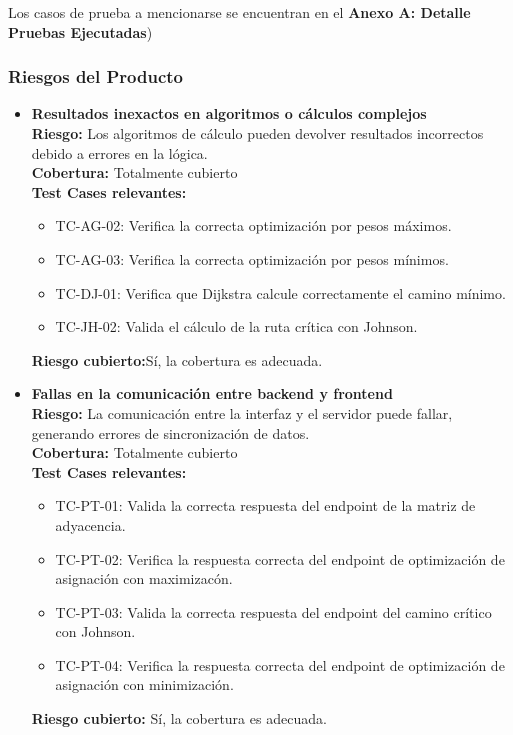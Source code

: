 \documentclass[stu, 12pt, letterpaper, donotrepeattitle, floatsintext, natbib]{apa7}
\begin{document}
\noindent Los casos de prueba a mencionarse se encuentran en el \textbf{Anexo A: Detalle Pruebas Ejecutadas})
\subsubsection{Riesgos del Producto}

\begin{itemize}
    \item \textbf{Resultados inexactos en algoritmos o cálculos complejos} \\ 
    \textbf{Riesgo:} Los algoritmos de cálculo pueden devolver resultados incorrectos debido a errores en la lógica. \\ 
    \textbf{Cobertura:} Totalmente cubierto \\ 
    \textbf{Test Cases relevantes:} 
    \begin{itemize}
      \item TC-AG-02: Verifica la correcta optimización por pesos máximos.
      \item TC-AG-03: Verifica la correcta optimización por pesos mínimos.
      \item TC-DJ-01: Verifica que Dijkstra calcule correctamente el camino mínimo.
      \item TC-JH-02: Valida el cálculo de la ruta crítica con Johnson.
    \end{itemize}
    \textbf{Riesgo cubierto:}Sí, la cobertura es adecuada.
  
    \item \textbf{Fallas en la comunicación entre backend y frontend} \\ 
    \textbf{Riesgo:} La comunicación entre la interfaz y el servidor puede fallar, generando errores de sincronización de datos. \\ 
    \textbf{Cobertura:} Totalmente cubierto \\ 
    \textbf{Test Cases relevantes:} 
    \begin{itemize}
      \item TC-PT-01: Valida la correcta respuesta del endpoint de la matriz de adyacencia.
      \item TC-PT-02: Verifica la respuesta correcta del endpoint de optimización de asignación con maximizacón.
      \item TC-PT-03: Valida la correcta respuesta del endpoint del camino crítico con Johnson.
      \item TC-PT-04: Verifica la respuesta correcta del endpoint de optimización de asignación con minimización.
    \end{itemize}
    \textbf{Riesgo cubierto:} Sí, la cobertura es adecuada.
  

\end{itemize}
\end{document}
